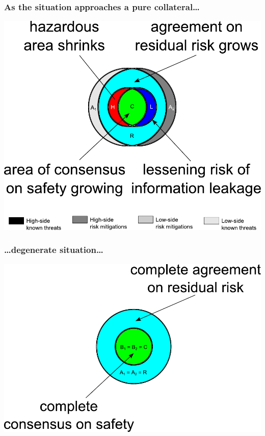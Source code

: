 \documentclass{beamer}
\begin{document}
\begin{frame}
	\frametitle{As the situation approaches a pure collateral\ldots}
	\begin{center}
		\includegraphics[width=\textwidth]{venn_diagrams_for_slides_6.pdf}
	\end{center}
\end{frame}

\begin{frame}
	\frametitle{\ldots degenerate situation\ldots}
	\begin{center}
		\includegraphics[width=\textwidth]{venn_diagrams_for_slides_7.pdf}
	\end{center}
\end{frame}
\end{document}
